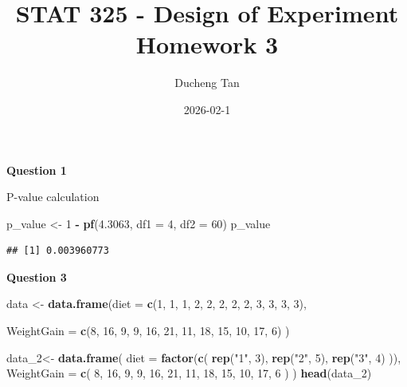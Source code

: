 \documentclass[
]{article}
\title{STAT 325 - Design of Experiment Homework 3}
\author{Ducheng Tan}
\date{2026-02-1}
\newenvironment{Shaded}{\begin{snugshade}}{\end{snugshade}}
\newcommand{\AttributeTok}[1]{\textcolor[rgb]{0.13,0.29,0.53}{#1}}
\newcommand{\DecValTok}[1]{\textcolor[rgb]{0.00,0.00,0.81}{#1}}
\newcommand{\FloatTok}[1]{\textcolor[rgb]{0.00,0.00,0.81}{#1}}
\newcommand{\FunctionTok}[1]{\textcolor[rgb]{0.13,0.29,0.53}{\textbf{#1}}}
\newcommand{\NormalTok}[1]{#1}
\newcommand{\OtherTok}[1]{\textcolor[rgb]{0.56,0.35,0.01}{#1}}
\newcommand{\SpecialCharTok}[1]{\textcolor[rgb]{0.81,0.36,0.00}{\textbf{#1}}}
\newcommand{\StringTok}[1]{\textcolor[rgb]{0.31,0.60,0.02}{#1}}
\begin{document}
\maketitle

\textbf{Question 1}

P-value calculation

\begin{Shaded}
\begin{Highlighting}[]
\NormalTok{p\_value }\OtherTok{\textless{}{-}} \DecValTok{1} \SpecialCharTok{{-}} \FunctionTok{pf}\NormalTok{(}\FloatTok{4.3063}\NormalTok{, }\AttributeTok{df1 =} \DecValTok{4}\NormalTok{, }\AttributeTok{df2 =} \DecValTok{60}\NormalTok{)}
\NormalTok{p\_value}
\end{Highlighting}
\end{Shaded}

\begin{verbatim}
## [1] 0.003960773
\end{verbatim}

\textbf{Question 3}

\begin{Shaded}
\begin{Highlighting}[]
\NormalTok{data }\OtherTok{\textless{}{-}} \FunctionTok{data.frame}\NormalTok{(}\AttributeTok{diet =} \FunctionTok{c}\NormalTok{(}\DecValTok{1}\NormalTok{, }\DecValTok{1}\NormalTok{, }\DecValTok{1}\NormalTok{,}
           \DecValTok{2}\NormalTok{, }\DecValTok{2}\NormalTok{, }\DecValTok{2}\NormalTok{, }\DecValTok{2}\NormalTok{, }\DecValTok{2}\NormalTok{,}
           \DecValTok{3}\NormalTok{, }\DecValTok{3}\NormalTok{, }\DecValTok{3}\NormalTok{, }\DecValTok{3}\NormalTok{), }
           
\AttributeTok{WeightGain =} \FunctionTok{c}\NormalTok{(}\DecValTok{8}\NormalTok{, }\DecValTok{16}\NormalTok{, }\DecValTok{9}\NormalTok{,}
                 \DecValTok{9}\NormalTok{, }\DecValTok{16}\NormalTok{, }\DecValTok{21}\NormalTok{, }\DecValTok{11}\NormalTok{, }\DecValTok{18}\NormalTok{,}
                 \DecValTok{15}\NormalTok{, }\DecValTok{10}\NormalTok{, }\DecValTok{17}\NormalTok{, }\DecValTok{6}\NormalTok{)}
\NormalTok{)}


\NormalTok{data\_2}\OtherTok{\textless{}{-}} \FunctionTok{data.frame}\NormalTok{(}
  \AttributeTok{diet =} \FunctionTok{factor}\NormalTok{(}\FunctionTok{c}\NormalTok{(}
    \FunctionTok{rep}\NormalTok{(}\StringTok{"1"}\NormalTok{, }\DecValTok{3}\NormalTok{),}
    \FunctionTok{rep}\NormalTok{(}\StringTok{"2"}\NormalTok{, }\DecValTok{5}\NormalTok{),}
    \FunctionTok{rep}\NormalTok{(}\StringTok{"3"}\NormalTok{, }\DecValTok{4}\NormalTok{)}
\NormalTok{  )),}
  \AttributeTok{WeightGain =} \FunctionTok{c}\NormalTok{(}
    \DecValTok{8}\NormalTok{, }\DecValTok{16}\NormalTok{, }\DecValTok{9}\NormalTok{,}
    \DecValTok{9}\NormalTok{, }\DecValTok{16}\NormalTok{, }\DecValTok{21}\NormalTok{, }\DecValTok{11}\NormalTok{, }\DecValTok{18}\NormalTok{,}
    \DecValTok{15}\NormalTok{, }\DecValTok{10}\NormalTok{, }\DecValTok{17}\NormalTok{, }\DecValTok{6}
\NormalTok{  )}
\NormalTok{)}
\FunctionTok{head}\NormalTok{(data\_2)}
\end{Highlighting}
\end{Shaded}
\end{document}
